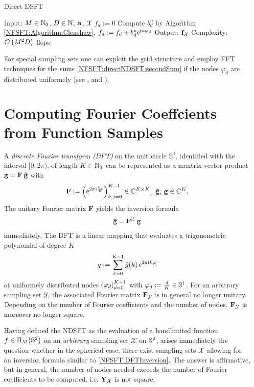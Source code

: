 \begin{algorithm}[tb]
  \caption{Direct DSFT}
  \label{NFSFT:directDSFT}    
  \begin{algorithmic}
    \STATE  Input: $M \in \mathbb{N}_{0}$, $D \in \mathbb{N}$, $\mathbf{a}$, $\mathcal{X}$
    \STATE
      \STATE $f_{d} := 0$
        \STATE Compute $b^{n}_d$ by Algorithm \ref{NFSFT:Algorithm:Clenshaw},
        \STATE $f_{d} := f_{d} + b^n_d \mbox{\rm{e}}^{\mbox{\scriptsize\rm{i}} n \varphi_{d}}$
      \ENDFOR
    \ENDFOR
    \STATE
    \STATE Output: $\mathbf{f}_{\mathcal{X}}$
    \STATE Complexity: $\mathcal{O}\left(M^2 D\right)$ flops
\end{algorithmic}
\end{algorithm}

For special sampling sets one can exploit the grid 
structure and employ FFT techniques for the sums \eqref{NFSFT:directNDSFT:secondSum} if the nodes $\varphi_{d}$ are distributed uniformely 
(see \cite{drhe}, \cite{postta97} and \cite{kupo02}). 


\section{Computing Fourier Coeffcients from Function Samples}
\label{NFSFT:iDSFT}
A \emph{discrete Fourier transform (DFT)} on the unit circle $\mathbb{S}^1$, identified with the interval $[0,2\pi)$, 
of length $K \in \mathbb{N}_{0}$ can be represented as a maxtrix-vector product
$\mathbf{g} = \mathbf{F} \: \mathbf{\hat{g}}$ with
\[
 \mathbf{F} := \left(\mbox{\rm{e}}^{2 \pi i \frac{kj}{K}}\right)_{k,j = 0}^{K-1} \in 
 \mathbb{C}^{K \times K},\ \mathbf{\hat{g}},\:\mathbf{g} \in \mathbb{C}^{K},
\]
The unitary Fourier matrix $\mathbf{F}$ yields the inversion formula
\begin{equation}
  \label{NFSFT:DFTInversion}
  \mathbf{\hat{g}} = \mathbf{F}^{\text{\rm{H}}} \: \mathbf{g}
\end{equation}
immediately. The DFT is a linear mapping that evaluates a 
trigonometric polynomial of degree $K$
\[
  g := \sum_{k=0}^{K-1} \hat{g}{\hspace{-0.4ex}}\left(k\right) \mbox{\rm{e}}^{2 \pi \mbox{\scriptsize\rm{i}} k \varphi}
\]
at uniformely distributed nodes $\left(\varphi_{d}\right)_{d=0}^{K-1}$ with $\varphi_{d} := \frac{d}{K} \in \mathbb{S}^1$. 
For an arbitrary sampling set $\mathcal{Y}$, the associated Fourier matrix 
$\mathbf{F}_{\mathcal{Y}}$ is in general no longer unitary. 
Depending on the number of Fourier coefficients and the number of nodes,
$\mathbf{F}_{\mathcal{Y}}$ is moreover no longer square.

Having defined the NDSFT as the evaluation of a bandlimited function $f \in 
\Pi_{M}{\hspace{-0.4ex}}\left(\mathbb{S}^2\right)$ on an \emph{arbitrary} 
sampling set $\mathcal{X}$ on $\mathbb{S}^2$, arises immediately the question 
whether in the spherical case, there exist sampling sets $\mathcal{X}$ allowing for an inversion formula similar to \eqref{NFSFT:DFTInversion}.
The answer is affirmative, but in general, the number of nodes needed exceeds the number of Fourier coefficients to be computed, 
i.e. $\mathbf{Y}_{\mathcal{X}}$ is not square.

